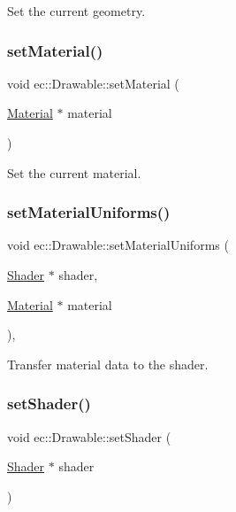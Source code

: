 Set the current geometry. \mbox{\label{classec_1_1_drawable_a0fc7868639a83830d4b60dfad85a0826}} 
\subsubsection{\texorpdfstring{set\+Material()}{setMaterial()}}
{\footnotesize\ttfamily void ec\+::\+Drawable\+::set\+Material (\begin{DoxyParamCaption}\item[{\mbox{\hyperlink{classec_1_1_material}{Material}} $\ast$}]{material }\end{DoxyParamCaption})}

Set the current material. \mbox{\label{classec_1_1_drawable_af2b64f8e6faa71bee8cccb14387d8432}} 
\subsubsection{\texorpdfstring{set\+Material\+Uniforms()}{setMaterialUniforms()}}
{\footnotesize\ttfamily void ec\+::\+Drawable\+::set\+Material\+Uniforms (\begin{DoxyParamCaption}\item[{\mbox{\hyperlink{classec_1_1_shader}{Shader}} $\ast$}]{shader,  }\item[{\mbox{\hyperlink{classec_1_1_material}{Material}} $\ast$}]{material }\end{DoxyParamCaption})\hspace{0.3cm}{\ttfamily [static]}, {\ttfamily [protected]}}

Transfer material data to the shader. \mbox{\label{classec_1_1_drawable_a413f373bb2cba109497377e18b084048}} 
\subsubsection{\texorpdfstring{set\+Shader()}{setShader()}}
{\footnotesize\ttfamily void ec\+::\+Drawable\+::set\+Shader (\begin{DoxyParamCaption}\item[{\mbox{\hyperlink{classec_1_1_shader}{Shader}} $\ast$}]{shader }\end{DoxyParamCaption})}

